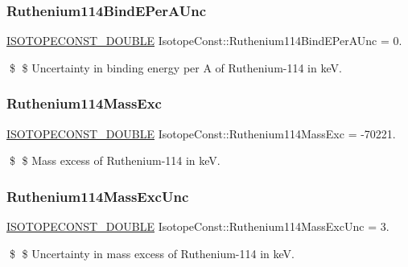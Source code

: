 \subsubsection{\texorpdfstring{Ruthenium114\+Bind\+E\+Per\+A\+Unc}{Ruthenium114BindEPerAUnc}}
{\footnotesize\ttfamily \mbox{\hyperlink{group___isotope_const-_macros_ga8f45a7272ce02c0b4c65c44636ed719a}{I\+S\+O\+T\+O\+P\+E\+C\+O\+N\+S\+T\+\_\+\+D\+O\+U\+B\+LE}} Isotope\+Const\+::\+Ruthenium114\+Bind\+E\+Per\+A\+Unc = 0.}

\$ \$ Uncertainty in binding energy per A of Ruthenium-\/114 in keV. \mbox{\label{group___isotope_const-_ruthenium-_ru114_gaa38600898001f617ef202d48c54925d4}} 
\subsubsection{\texorpdfstring{Ruthenium114\+Mass\+Exc}{Ruthenium114MassExc}}
{\footnotesize\ttfamily \mbox{\hyperlink{group___isotope_const-_macros_ga8f45a7272ce02c0b4c65c44636ed719a}{I\+S\+O\+T\+O\+P\+E\+C\+O\+N\+S\+T\+\_\+\+D\+O\+U\+B\+LE}} Isotope\+Const\+::\+Ruthenium114\+Mass\+Exc = -\/70221.}

\$ \$ Mass excess of Ruthenium-\/114 in keV. \mbox{\label{group___isotope_const-_ruthenium-_ru114_ga8bcc688f6a628c9286325b61d81868b4}} 
\subsubsection{\texorpdfstring{Ruthenium114\+Mass\+Exc\+Unc}{Ruthenium114MassExcUnc}}
{\footnotesize\ttfamily \mbox{\hyperlink{group___isotope_const-_macros_ga8f45a7272ce02c0b4c65c44636ed719a}{I\+S\+O\+T\+O\+P\+E\+C\+O\+N\+S\+T\+\_\+\+D\+O\+U\+B\+LE}} Isotope\+Const\+::\+Ruthenium114\+Mass\+Exc\+Unc = 3.}

\$ \$ Uncertainty in mass excess of Ruthenium-\/114 in keV. \mbox{\label{group___isotope_const-_ruthenium-_ru114_ga52c6a1501dd0279f0837848b4f6d5900}} 
